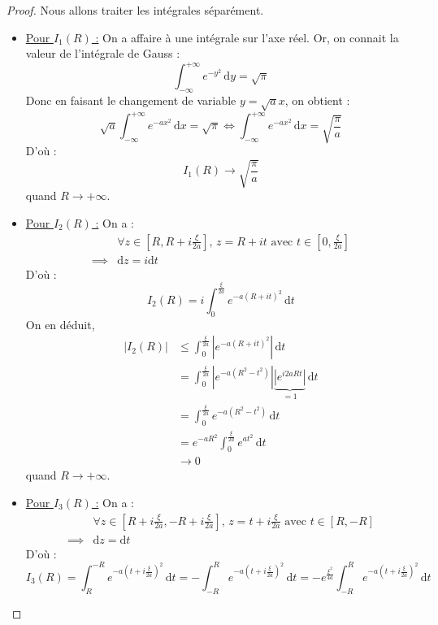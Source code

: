 \begin{proof}
    Nous allons traiter les intégrales séparément.
    \begin{itemize}
      \item \underline{Pour $I_1(R)$ :} On a affaire à une intégrale sur l'axe réel. Or, on connait la valeur de l'intégrale de Gauss :
      \[ \int_{-\infty}^{+\infty} e^{-y^2} \, \mathrm{d}y = \sqrt{\pi} \]
      Donc en faisant le changement de variable $y = \sqrt{a}x$, on obtient :
      \[ \sqrt{a} \int_{-\infty}^{+\infty} e^{-ax^2} \, \mathrm{d}x = \sqrt{\pi} \iff \int_{-\infty}^{+\infty} e^{-ax^2} \, \mathrm{d}x = \sqrt{\frac{\pi}{a}} \]
      D'où :
      \[ I_1(R) \longrightarrow \sqrt{\frac{\pi}{a}} \]
      quand $R \longrightarrow +\infty$.
      \item \underline{Pour $I_2(R)$ :} On a :
      \begin{align*}
        &\forall z \in \left[ R, R + i \frac{\xi}{2a} \right], \, z = R + it \text{ avec $t \in \left[ 0, \frac{\xi}{2a} \right]$} \\
        \implies& \mathrm{d}z = i\mathrm{d}t
      \end{align*}
      D'où :
      \[ I_2(R) = i \int_0^{\frac{\xi}{2a}} e^{-a (R+it)^2} \, \mathrm{d}t \]
      On en déduit,
      \begin{align*}
        |I_2(R)| &\leq \int_0^{\frac{\xi}{2a}} \left| e^{-a (R+it)^2} \right| \, \mathrm{d}t \\
        &= \int_0^{\frac{\xi}{2a}} \left| e^{-a(R^2 - t^2)} \right| \underbrace{\left| e^{i 2aRt} \right|}_{= 1} \, \mathrm{d}t \\
        &= \int_0^{\frac{\xi}{2a}} e^{-a(R^2 - t^2)} \, \mathrm{d}t \\
        &= e^{-aR^2} \int_0^{\frac{\xi}{2a}} e^{at^2} \, \mathrm{d}t \\
        &\longrightarrow 0
      \end{align*}
      quand $R \longrightarrow +\infty$.
      \item \underline{Pour $I_3(R)$ :} On a :
      \begin{align*}
        &\forall z \in \left[ R + i \frac{\xi}{2a}, -R + i \frac{\xi}{2a} \right], \, z = t + i\frac{\xi}{2a} \text{ avec $t \in \left[ R, -R \right]$} \\
        \implies& \mathrm{d}z = \mathrm{d}t
      \end{align*}
      D'où :
      \[ I_3(R) = \int_R^{-R} e^{-a \left(t + i \frac{\xi}{2a} \right)^2} \, \mathrm{d}t = - \int_{-R}^R e^{-a \left(t + i \frac{\xi}{2a} \right)^2} \, \mathrm{d}t = - e^{\frac{\xi^2}{4a}} \int_{-R}^R e^{-a \left( t + i \frac{\xi}{2a} \right)^2} \, \mathrm{d}t \]

\end{itemize}
\end{proof}
